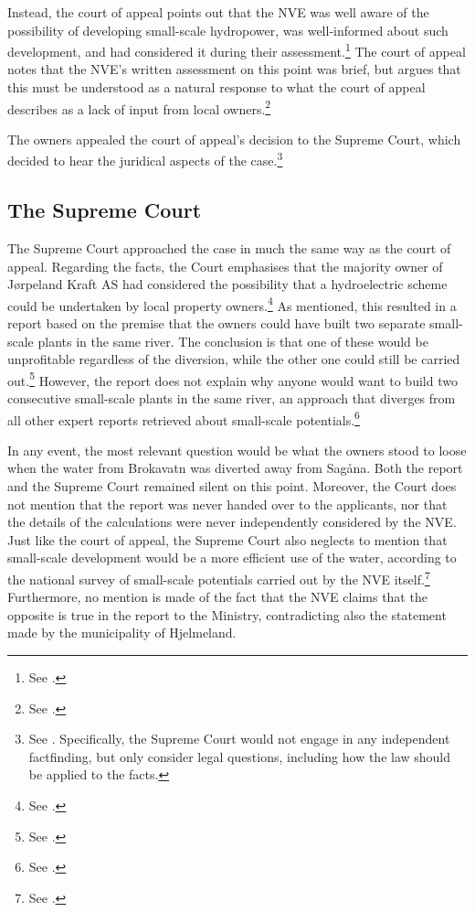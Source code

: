 Instead, the court of appeal points out that the NVE was well aware of the possibility of developing small-scale hydropower, was well-informed about such development, and had considered it during their assessment.\footnote{See \cite[9]{jorpeland11a}.} The court of appeal notes that the NVE's written assessment on this point was brief, but argues that this must be understood as a natural response to what the court of appeal describes as a lack of input from local owners.\footnote{See \cite[9]{jorpeland11a}.}

The owners appealed the court of appeal's decision to the Supreme Court, which decided to hear the  juridical aspects of the case.\footnote{See \cite[8]{jorpeland11}. Specifically, the Supreme Court would not engage in any independent factfinding, but only consider legal questions, including how the law should be applied to the facts.}

\subsection{The Supreme Court}

The Supreme Court approached the case in much the same way as the court of appeal. Regarding the facts, the Court emphasises that the majority owner of Jørpeland Kraft AS had considered the possibility that a hydroelectric scheme could be undertaken by local property owners.\footnote{See \cite[53]{jorpeland11}.} As mentioned, this resulted in a report based on the premise that the owners could have built two separate small-scale plants in the same river. The conclusion is that one of these would be unprofitable regardless of the diversion, while the other one could still be carried out.\footnote{See \cite[23]{jorpeland09}.} However, the report does not explain why anyone would want to build two consecutive small-scale plants in the same river, an approach that diverges from all other expert reports retrieved about small-scale potentials.\footnote{See \cite[16|23]{jorpeland09}.}

In any event, the most relevant question would be what the owners stood to loose when the water from Brokavatn was diverted away from Sagåna. Both the report and the Supreme Court remained silent on this point. Moreover, the Court does not mention that the report was never handed over to the applicants, nor that the details of the calculations were never independently considered by the NVE. Just like the court of appeal, the Supreme Court also neglects to mention that small-scale development would be a more efficient use of the water, according to the national survey of small-scale potentials carried out by the NVE itself.\footnote{See \cite[16]{jorpeland09}.} Furthermore, no mention is made of the fact that the NVE claims that the opposite is true in the report to the Ministry, contradicting also the statement made by the municipality of Hjelmeland.

